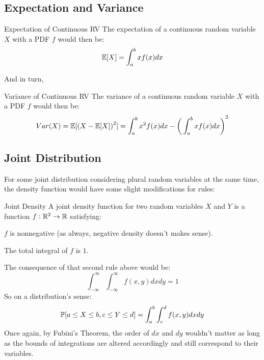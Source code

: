 \subsection{Expectation and Variance}
\begin{ln-define}{Expectation of Continuous RV}{}
    The expectation of a continuous random variable $X$ with a PDF $f$ would then be:
    \[
        \E[X] = \int_a^b xf(x) dx
    \]
\end{ln-define}
And in turn,
\begin{ln-define}{Variance of Continuous RV}{}
    The variance of a continuous random variable $X$ with a PDF $f$ would then be:
    \[
        Var(X) = \E[{(X - \E[X])}^2] = \int_a^b x^2 f(x) dx - {\bigg( \int_a^b xf(x) dx \bigg)}^2
    \]
\end{ln-define}

\subsection{Joint Distribution}
For some joint distribution considering plural random variables at the same time, the density function would have some slight modifications for rules:
\begin{ln-define}{Joint Density}{}
    A joint density function for two random variables $X$ and $Y$ is a function $f : \R^2 \rightarrow \R$ satisfying:
    \begin{bindenum}
        \item $f$ is nonnegative (as always, negative density doesn't makes sense).
        \item The total integral of $f$ is $1$.
    \end{bindenum}
    The consequence of that second rule above would be:
    \[
        \int_{-\infty}^{\infty} \int_{-\infty}^{\infty} f(x, y) dx dy = 1
    \]
    So on a distribution's sense:
    \[
        \P[a \leq X \leq b, c \leq Y \leq d] = \int_a^b \int_c^d f(x, y) dx dy
    \]
    Once again, by Fubini's Theorem, the order of $dx$ and $dy$ wouldn't matter as long as the bounds of integrations are altered accordingly and still correspond to their variables.
\end{ln-define}

